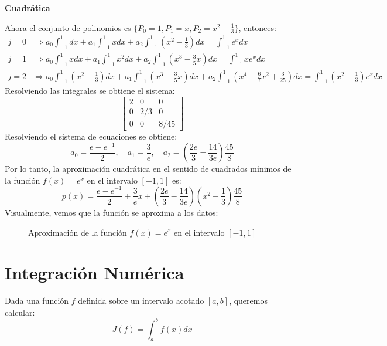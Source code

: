 \documentclass{article}
\begin{document}
\begin{center}
    \textbf{Cuadrática}
\end{center}
Ahora el conjunto de polinomios es $\{ P_0 = 1, P_1 = x, P_2 = x^2 - \frac{1}{3} \}$, entonces:
\begin{align}
    j = 0 &\Rightarrow a_0 \int_{-1}^{1} dx + a_1 \int_{-1}^{1} x dx + a_2 \int_{-1}^{1} (x^2 - \frac{1}{3}) dx = \int_{-1}^{1} e^x dx \\
    j = 1 &\Rightarrow a_0 \int_{-1}^{1} x dx + a_1 \int_{-1}^{1} x^2 dx + a_2 \int_{-1}^{1} (x^3 - \frac{3}{5}x) dx = \int_{-1}^{1} xe^x dx \\
    j = 2 &\Rightarrow a_0 \int_{-1}^{1} (x^2 - \frac{1}{3}) dx + a_1 \int_{-1}^{1} (x^3 - \frac{3}{5}x) dx + a_2 \int_{-1}^{1} (x^4 - \frac{6}{7}x^2 + \frac{3}{25}) dx = \int_{-1}^{1} (x^2 - \frac{1}{3})e^x dx
\end{align}
Resolviendo las integrales se obtiene el sistema:
\begin{equation}
    \begin{bmatrix}
        2 & 0 & 0 \\
        0 & 2/3 & 0 \\
        0 & 0 & 8/45
    \end{bmatrix}
\end{equation}
Resolviendo el sistema de ecuaciones se obtiene:
\begin{equation}
    a_0 = \frac{e - e^{-1}}{2}, \quad a_1 = \frac{3}{e}, \quad a_2 = (\frac{2e}{3} - \frac{14}{3e}) \frac{45}{8}
\end{equation}
Por lo tanto, la aproximación cuadrática en el sentido de cuadrados mínimos de la función \( f(x) = e^x \) en el intervalo \([-1,1]\) es:
\begin{equation}
    p(x) = \frac{e - e^{-1}}{2} + \frac{3}{e}x + \left( \frac{2e}{3} - \frac{14}{3e} \right) \left( x^2 - \frac{1}{3} \right) \frac{45}{8}
\end{equation}
\newpage
Visualmente, vemos que la función se aproxima a los datos:
\begin{figure}[h]
    \centering
    \caption{Aproximación de la función \( f(x) = e^x \) en el intervalo \([-1,1]\)}
    \label{fig:myplot14}
\end{figure}
\newpage
\section[Unidad 5 - Integración Numérica]{Integración Numérica}
Dada una función $f$ definida sobre un intervalo acotado $[a,b]$, queremos calcular:
\begin{equation}
    J(f) = \int_{a}^{b} f(x) dx
\end{equation}
\end{document}
